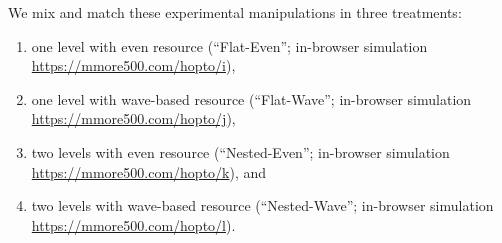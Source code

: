 We mix and match these experimental manipulations in three treatments:
\begin{enumerate}
\item one level with even resource (``Flat-Even''; in-browser simulation \url{https://mmore500.com/hopto/i}),
\item one level with wave-based resource (``Flat-Wave''; in-browser simulation \url{https://mmore500.com/hopto/j}),
\item two levels with even resource (``Nested-Even''; in-browser simulation \url{https://mmore500.com/hopto/k}), and
\item two levels with wave-based resource (``Nested-Wave''; in-browser simulation \url{https://mmore500.com/hopto/l}).
\end{enumerate}
